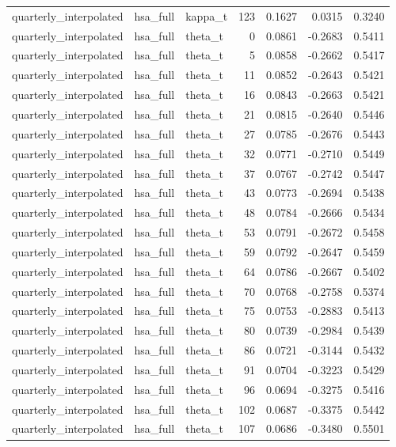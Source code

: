 \begin{tabular}{lllrrrr}
quarterly\_interpolated & hsa\_full & kappa\_t & 123 & 0.1627 & 0.0315 & 0.3240 \\
quarterly\_interpolated & hsa\_full & theta\_t & 0 & 0.0861 & -0.2683 & 0.5411 \\
quarterly\_interpolated & hsa\_full & theta\_t & 5 & 0.0858 & -0.2662 & 0.5417 \\
quarterly\_interpolated & hsa\_full & theta\_t & 11 & 0.0852 & -0.2643 & 0.5421 \\
quarterly\_interpolated & hsa\_full & theta\_t & 16 & 0.0843 & -0.2663 & 0.5421 \\
quarterly\_interpolated & hsa\_full & theta\_t & 21 & 0.0815 & -0.2640 & 0.5446 \\
quarterly\_interpolated & hsa\_full & theta\_t & 27 & 0.0785 & -0.2676 & 0.5443 \\
quarterly\_interpolated & hsa\_full & theta\_t & 32 & 0.0771 & -0.2710 & 0.5449 \\
quarterly\_interpolated & hsa\_full & theta\_t & 37 & 0.0767 & -0.2742 & 0.5447 \\
quarterly\_interpolated & hsa\_full & theta\_t & 43 & 0.0773 & -0.2694 & 0.5438 \\
quarterly\_interpolated & hsa\_full & theta\_t & 48 & 0.0784 & -0.2666 & 0.5434 \\
quarterly\_interpolated & hsa\_full & theta\_t & 53 & 0.0791 & -0.2672 & 0.5458 \\
quarterly\_interpolated & hsa\_full & theta\_t & 59 & 0.0792 & -0.2647 & 0.5459 \\
quarterly\_interpolated & hsa\_full & theta\_t & 64 & 0.0786 & -0.2667 & 0.5402 \\
quarterly\_interpolated & hsa\_full & theta\_t & 70 & 0.0768 & -0.2758 & 0.5374 \\
quarterly\_interpolated & hsa\_full & theta\_t & 75 & 0.0753 & -0.2883 & 0.5413 \\
quarterly\_interpolated & hsa\_full & theta\_t & 80 & 0.0739 & -0.2984 & 0.5439 \\
quarterly\_interpolated & hsa\_full & theta\_t & 86 & 0.0721 & -0.3144 & 0.5432 \\
quarterly\_interpolated & hsa\_full & theta\_t & 91 & 0.0704 & -0.3223 & 0.5429 \\
quarterly\_interpolated & hsa\_full & theta\_t & 96 & 0.0694 & -0.3275 & 0.5416 \\
quarterly\_interpolated & hsa\_full & theta\_t & 102 & 0.0687 & -0.3375 & 0.5442 \\
quarterly\_interpolated & hsa\_full & theta\_t & 107 & 0.0686 & -0.3480 & 0.5501 \\

\end{tabular}
